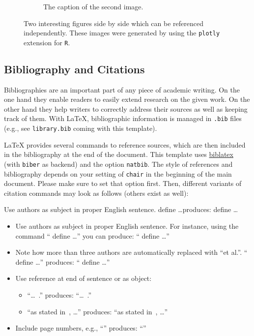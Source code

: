 \documentclass[
    language=english, %
    thesis=bachelor, %
    supervisor=postdoc, %
    multiauthor=false, %
    ]{settings/csssa-thesis}
\begin{document}
\begin{figure}[ht]
\begin{subfigure}{0.49\textwidth}
        \caption{The caption of the second image.}\label{ch02:fig:fig1b}
    \end{subfigure}\label{ch02:fig:fig1}
    \caption{Two interesting figures side by side which can be referenced independently. These images were generated by using the \texttt{plotly} extension for \texttt{R}.}
\end{figure}

\subsection{Bibliography and Citations}

Bibliographies are an important part of any piece of academic writing. On the one hand they enable readers to easily extend research on the given work.  On the other hand they help writers to correctly address their sources as well as keeping track of them.  With \LaTeX{}, bibliographic information is managed in \texttt{.bib} files (e.g., see \texttt{library.bib} coming with this template).

\LaTeX{} provides several commands to reference sources, which are then included in the bibliography at the end of the document.  This template uses \href{http://ctan.org/pkg/biblatex}{biblatex} (with \texttt{biber} as backend) and the option \texttt{natbib}.  The style of references and bibliography depends on your setting of \texttt{chair} in the beginning of the main document.  Please make sure to set that option first.  Then, different variants of citation commands may look as follows (others exist as well):

Use authors as subject in proper English sentence.  define \ldots produces: \textcite{Goodfellow2016deep} define \ldots

\begin{itemize}
    \item Use authors as subject in proper English sentence. For instance, using the command  `` define \ldots'' you can produce: ``\textcite{Goodfellow2016deep} define \ldots''
    \item Note how more than three authors are automatically replaced with “et al.”. `` define \ldots'' produces: ``\textcite{Goodfellow2014gan} define \ldots''
    \item Use reference at end of sentence or as object:
      \begin{itemize}
      \item ``\ldots~.'' produces: ``\ldots~\citep{Goodfellow2014gan}.''
      \item ``as stated in~, \ldots'' produces: ``as stated in~\citep{Goodfellow2014gan}, \ldots''
      \end{itemize}
    \item Include page numbers, e.g., ``'' produces: ``\citep[p.~2]{Codd1970relational}''
    \end{itemize}
\end{document}
